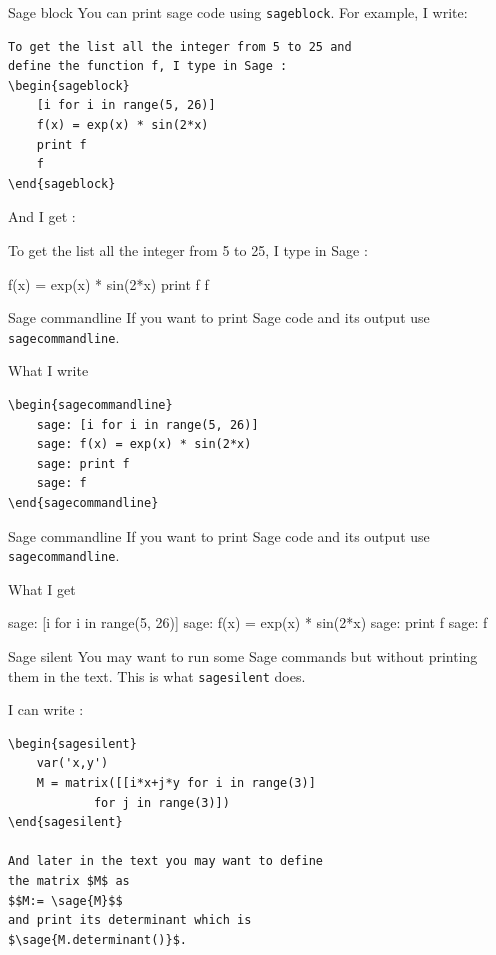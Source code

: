 \documentclass[10pts]{beamer}
\begin{document}
	\begin{frame}[fragile]{Sage block}
	You can print sage code using \texttt{sageblock}.
	For example, I write:
	
	\begin{Verbatim}[frame=single]
To get the list all the integer from 5 to 25 and
define the function f, I type in Sage :
\begin{sageblock}
	[i for i in range(5, 26)]
	f(x) = exp(x) * sin(2*x)
	print f
	f
\end{sageblock}
	\end{Verbatim}
	
	And I get : 
	
	To get the list all the integer from 5 to 25, I type in Sage :
	\begin{sageblock}
		f(x) = exp(x) * sin(2*x)
		print f
		f
	\end{sageblock}
		
	\end{frame}
	\begin{frame}[fragile]{Sage commandline}
		If you want to print Sage code and its output use \texttt{sagecommandline}. \newline 
		
		What I write
		\begin{Verbatim}[frame=single]
\begin{sagecommandline}
	sage: [i for i in range(5, 26)]
	sage: f(x) = exp(x) * sin(2*x)
	sage: print f
	sage: f
\end{sagecommandline}
		\end{Verbatim}	
	
	\end{frame}
	\begin{frame}[fragile]{Sage commandline}
		If you want to print Sage code and its output use \texttt{sagecommandline}. \newline 
				
		What I get
		
		\begin{sagecommandline}
			sage: [i for i in range(5, 26)]
			sage: f(x) = exp(x) * sin(2*x)
			sage: print f
			sage: f
		\end{sagecommandline}	
		
		\end{frame}
	\begin{frame}[fragile]{Sage silent}
		You may want to run some Sage commands but without printing them in the text. This is what \texttt{sagesilent} does. \newline
		
		I can write : \newline
		
		\begin{Verbatim}[frame=single]
\begin{sagesilent}
	var('x,y')
	M = matrix([[i*x+j*y for i in range(3)] 
			for j in range(3)])
\end{sagesilent}

And later in the text you may want to define 
the matrix $M$ as 
$$M:= \sage{M}$$
and print its determinant which is 
$\sage{M.determinant()}$.
		\end{Verbatim}
	
	\end{frame}
\end{document}
